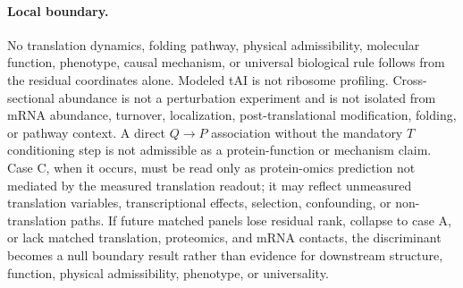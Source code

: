\paragraph{Local boundary.}
No translation dynamics, folding pathway, physical admissibility, molecular function, phenotype, causal mechanism, or universal biological rule follows from the residual coordinates alone. Modeled tAI is not ribosome profiling. Cross-sectional abundance is not a perturbation experiment and is not isolated from mRNA abundance, turnover, localization, post-translational modification, folding, or pathway context. A direct $Q\to P$ association without the mandatory $T$ conditioning step is not admissible as a protein-function or mechanism claim. Case C, when it occurs, must be read only as protein-omics prediction not mediated by the measured translation readout; it may reflect unmeasured translation variables, transcriptional effects, selection, confounding, or non-translation paths. If future matched panels lose residual rank, collapse to case A, or lack matched translation, proteomics, and mRNA contacts, the discriminant becomes a null boundary result rather than evidence for downstream structure, function, physical admissibility, phenotype, or universality.

